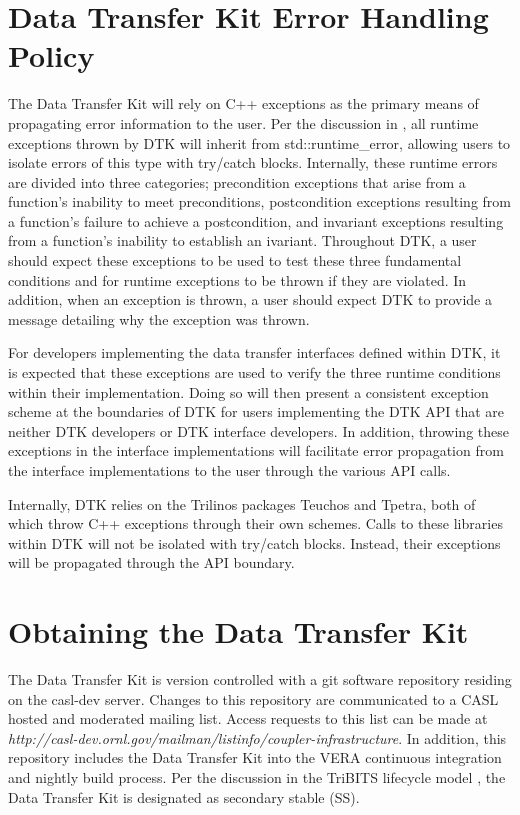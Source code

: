 \documentclass[letterpaper]{article}
\begin{document}
\section{Data Transfer Kit Error Handling Policy}
The Data Transfer Kit will rely on C++ exceptions as the
primary means of propagating error information to the user. Per the
discussion in \cite{Sutter_2004}, all runtime exceptions thrown by DTK
will inherit from std::runtime\_error, allowing users to isolate
errors of this type with try/catch blocks. Internally, these runtime
errors are divided into three categories; precondition exceptions that
arise from a function's inability to meet preconditions, postcondition
exceptions resulting from a function's failure to achieve a
postcondition, and invariant exceptions resulting from a function's
inability to establish an ivariant. Throughout DTK, a user should
expect these exceptions to be used to test these three fundamental
conditions and for runtime exceptions to be thrown if they are
violated. In addition, when an exception is thrown, a user should
expect DTK to provide a message detailing why the exception was
thrown.

For developers implementing the data transfer interfaces defined
within DTK, it is expected that these exceptions are used to verify
the three runtime conditions within their implementation. Doing so
will then present a consistent exception scheme at the boundaries of
DTK  for users implementing the DTK API that are neither DTK
developers or DTK interface developers. In addition, throwing these
exceptions in the interface implementations will facilitate error
propagation from the interface implementations to the user through the
various API calls. 

Internally, DTK relies on the Trilinos packages Teuchos and Tpetra,
both of which throw C++ exceptions through their own schemes. Calls to
these libraries within DTK will not be isolated with try/catch
blocks. Instead, their exceptions will be propagated through the API
boundary.

\section{Obtaining the Data Transfer Kit}
The Data Transfer Kit is version controlled with a git software
repository residing on the casl-dev server. Changes to this repository
are communicated to a CASL hosted and moderated mailing list. Access
requests to this list can be made at {\sl
  http://casl-dev.ornl.gov/mailman/listinfo/coupler-infrastructure}. In
addition, this repository includes the Data Transfer Kit into the VERA
continuous integration and nightly build process. Per the discussion
in the TriBITS lifecycle model \cite{Bartlett_2012}, the Data Transfer
Kit is designated as secondary stable (SS).
\end{document}

